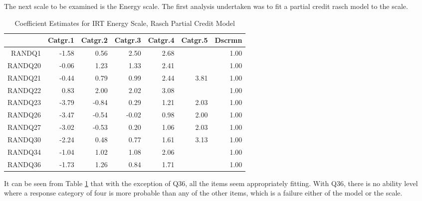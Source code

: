 \documentclass{article}
\begin{document}
The next scale to be examined is the  Energy scale.  The first analysis undertaken was to fit a partial credit rasch model to the scale.

\begin{table}[ht]
\centering
\begin{tabular}{rrrrrrr}
  \hline
 & Catgr.1 & Catgr.2 & Catgr.3 & Catgr.4 & Catgr.5 & Dscrmn \\ 
  \hline
RANDQ1 & -1.58 & 0.56 & 2.50 & 2.68 &  & 1.00 \\ 
  RANDQ20 & -0.06 & 1.23 & 1.33 & 2.41 &  & 1.00 \\ 
  RANDQ21 & -0.44 & 0.79 & 0.99 & 2.44 & 3.81 & 1.00 \\ 
  RANDQ22 & 0.83 & 2.00 & 2.02 & 3.08 &  & 1.00 \\ 
  RANDQ23 & -3.79 & -0.84 & 0.29 & 1.21 & 2.03 & 1.00 \\ 
  RANDQ26 & -3.47 & -0.54 & -0.02 & 0.98 & 2.00 & 1.00 \\ 
  RANDQ27 & -3.02 & -0.53 & 0.20 & 1.06 & 2.03 & 1.00 \\ 
  RANDQ30 & -2.24 & 0.48 & 0.77 & 1.61 & 3.13 & 1.00 \\ 
  RANDQ34 & -1.04 & 1.02 & 1.08 & 2.06 &  & 1.00 \\ 
  RANDQ36 & -1.73 & 1.26 & 0.84 & 1.71 &  & 1.00 \\ 
   \hline
\end{tabular}
\caption{Coefficient Estimates for IRT Energy Scale, Rasch Partial Credit Model} 
\label{tab:hom1energpcmrasch}
\end{table}

It can be seen from Table \ref{tab:hom1energpcmrasch} that with the exception of Q36, all the items seem appropriately fitting. With Q36, there is no ability level where a response category of four is more probable than any of the other items, which is a failure either of the model or the scale. 
\end{document}

